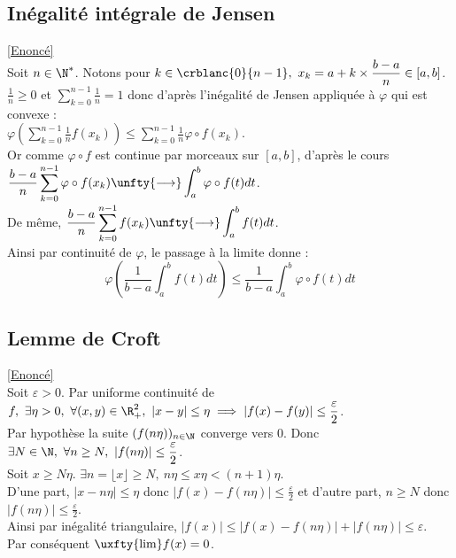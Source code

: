 \documentclass{book}
\begin{document}
	\subsection{Inégalité intégrale de Jensen }
	\label{Inégalité intégrale de Jensen corrigé}
	\textcolor{blue}{\hyperref[Inégalité intégrale de Jensen]{[Enoncé]}}\\
	Soit $n\in \N^*$. Notons pour $k\in \crblanc{0}{n-1},\ x_k=a+k\times\displaystyle\frac{b-a}{n}\in [a,b]$.\\
	$\displaystyle\frac{1}{n}\geq 0$ et $\displaystyle\sum_{k=0}^{n-1}\frac{1}{n}=1$ donc d'après l'inégalité de Jensen appliquée à $\varphi$ qui est convexe :\\
	$\displaystyle\varphi\left(\sum_{k=0}^{n-1}\frac{1}{n}f(x_k)\right)\leq \sum_{k=0}^{n-1}\frac{1}{n}\varphi\circ f(x_k)$.\\
	Or comme $\varphi\circ f$ est continue par morceaux sur $[a,b]$, d'après le cours $\displaystyle\frac{b-a}{n}\sum_{k=0}^{n-1}\varphi\circ f(x_k)\unfty{\longrightarrow}\int_a^b\varphi\circ f(t)dt$.\\
	De même, $\displaystyle\frac{b-a}{n}\sum_{k=0}^{n-1}f(x_k)\unfty{\longrightarrow}\int_a^bf(t)dt$.\\
	Ainsi par continuité de $\varphi$, le passage à la limite donne :
	$$\displaystyle\varphi\left(\frac{1}{b-a}\int_a^bf(t)dt\right)\leq \frac{1}{b-a}\int_a^b\varphi\circ f(t)dt$$
	
	\subsection{Lemme de Croft }
	\label{Lemme de Croft corrigé}
	\textcolor{blue}{\hyperref[Lemme de Croft]{[Enoncé]}}\\
	Soit $\varepsilon>0$. Par uniforme continuité de $f,\ \exists\eta>0,\ \forall (x,y)\in \R_+^2,\ |x-y|\leq\eta\implies|f(x)-f(y)|\leq\displaystyle\frac{\varepsilon}{2}$.\\
	Par hypothèse la suite $(f(n\eta))_{n\in \N}$ converge vers $0$. Donc $\exists N\in \N,\ \forall n\geq N,\ |f(n\eta)|\leq\displaystyle\frac{\varepsilon}{2}$.\\
	Soit $x\geq N\eta$. $\exists n=\displaystyle\lfloor x\rfloor\geq N,\ n\eta\leq x\eta<(n+1)\eta$.\\
	D'une part, $|x-n\eta|\leq \eta$ donc $|f(x)-f(n\eta)|\leq\displaystyle\frac{\varepsilon}{2}$ et d'autre part, $n\geq N$ donc $|f(n\eta)|\leq\displaystyle\frac{\varepsilon}{2}$.\\
	Ainsi par inégalité triangulaire, $|f(x)|\leq |f(x)-f(n\eta)|+|f(n\eta)|\leq \varepsilon$.\\
	Par conséquent $\uxfty{\lim}f(x)=0$.
	
\end{document}
